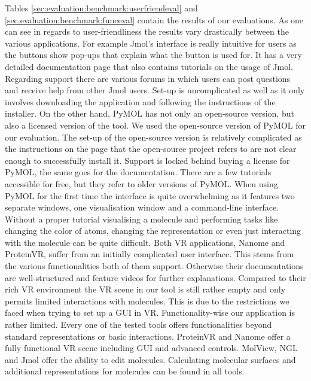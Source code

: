 Tables \ref{sec:evaluation:benchmark:userfriendeval} and \ref{sec.evaluation:benchmark:funceval} contain the results of our evaluations. As one can see in regards to user-friendliness the results vary drastically between the various applications. For example Jmol's interface is really intuitive for users as the buttons show pop-ups that explain what the button is used for. It has a very detailed documentation page that also contains tutorials on the usage of Jmol. Regarding support there are various forums in which users can post questions and receive help from other Jmol users. Set-up is uncomplicated as well as it only involves downloading the application and following the instructions of the installer. On the other hand, PyMOL has not only an open-source version, but also a licensed version of the tool. We used the open-source version of PyMOL for our evaluation. The set-up of the open-source version is relatively complicated as the instructions on the page that the open-source project refers to are not clear enough to successfully install it. Support is locked behind buying a license for PyMOL, the same goes for the documentation. There are a few tutorials accessible for free, but they refer to older versions of PyMOL. When using PyMOL for the first time the interface is quite overwhelming as it features two separate windows, one visualisation window and a command-line interface. Without a proper tutorial visualising a molecule and performing tasks like changing the color of atoms, changing the representation or even just interacting with the molecule can be quite difficult. Both VR applications, Nanome and ProteinVR, suffer from an initially complicated user interface. This stems from the various functionalities both of them support. Otherwise their documentations are well-structured and feature videos for further explanations. Compared to their rich VR environment the VR scene in our tool is still rather empty and only permits limited interactions with molecules. This is due to the restrictions we faced when trying to set up a GUI in VR. Functionality-wise our application is rather limited. Every one of the tested tools offers functionalities beyond standard representations or basic interactions. ProteinVR and Nanome offer a fully functional VR scene including GUI and advanced controls. MolView, NGL and Jmol offer the ability to edit molecules. Calculating molecular surfaces and additional representations for molecules can be found in all tools.

